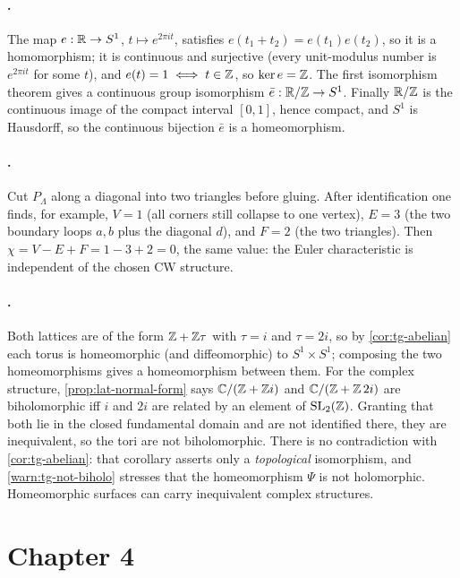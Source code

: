 \paragraph{.}
The map \(e : \mathbb{R} \to S^1\), \(t \mapsto e^{2\pi i t}\), satisfies
\(e(t_1 + t_2) = e(t_1)e(t_2)\), so it is a homomorphism; it is continuous and
surjective (every unit-modulus number is \(e^{2\pi i t}\) for some \(t\)), and
\(e(t) = 1 \iff t \in \mathbb{Z}\), so \(\ker e = \mathbb{Z}\). The first isomorphism theorem
gives a continuous group isomorphism \(\bar e : \mathbb{R}/\mathbb{Z} \to S^1\). Finally
\(\mathbb{R}/\mathbb{Z}\) is the continuous image of the compact interval \([0,1]\), hence
compact, and \(S^1\) is Hausdorff, so the continuous bijection \(\bar e\) is a
homeomorphism.

\paragraph{.}
Cut \(P_\Lambda\) along a diagonal into two triangles before gluing. After
identification one finds, for example, \(V = 1\) (all corners still collapse to
one vertex), \(E = 3\) (the two boundary loops \(a, b\) plus the diagonal
\(d\)), and \(F = 2\) (the two triangles). Then
\(\chi = V - E + F = 1 - 3 + 2 = 0\), the same value: the Euler characteristic
is independent of the chosen CW structure.

\paragraph{.}
Both lattices are of the form \(\mathbb{Z} + \mathbb{Z}\tau\) with \(\tau = i\) and
\(\tau = 2i\), so by \cref{cor:tg-abelian} each torus is homeomorphic (and
diffeomorphic) to \(S^1 \times S^1\); composing the two homeomorphisms gives a
homeomorphism between them. For the complex structure, \cref{prop:lat-normal-form}
says \(\mathbb{C}/(\mathbb{Z}+\mathbb{Z} i)\) and \(\mathbb{C}/(\mathbb{Z}+\mathbb{Z}\,2i)\) are biholomorphic iff \(i\) and
\(2i\) are related by an element of \(\mathrm{SL}_2(\mathbb{Z})\). Granting that both lie
in the closed fundamental domain and are not identified there, they are
inequivalent, so the tori are not biholomorphic. There is no contradiction with
\cref{cor:tg-abelian}: that corollary asserts only a \emph{topological}
isomorphism, and \cref{warn:tg-not-biholo} stresses that the homeomorphism
\(\Psi\) is not holomorphic. Homeomorphic surfaces can carry inequivalent complex
structures.

\section{Chapter 4}
\label{sec:soln-ch4}

